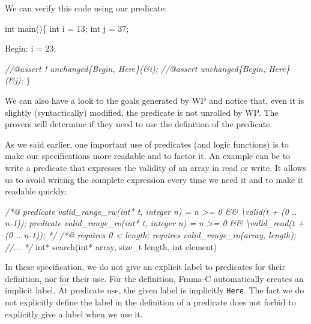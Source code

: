 \documentclass[12pt,francais,]{scrbook}
\newenvironment{Shaded}{}{}
\newcommand{\DataTypeTok}[1]{\textcolor[rgb]{0.56,0.13,0.00}{{#1}}}
\newcommand{\DecValTok}[1]{\textcolor[rgb]{0.25,0.63,0.44}{{#1}}}
\newcommand{\CommentTok}[1]{\textcolor[rgb]{0.38,0.63,0.69}{\textit{{#1}}}}
\newcommand{\NormalTok}[1]{{#1}}
\begin{document}
We can verify this code using our predicate:

\begin{footnotesize}\begin{Shaded}
\begin{Highlighting}[]
\DataTypeTok{int} \NormalTok{main()\{}
  \DataTypeTok{int} \NormalTok{i = }\DecValTok{13}\NormalTok{;}
  \DataTypeTok{int} \NormalTok{j = }\DecValTok{37}\NormalTok{;}

 \NormalTok{Begin:}
  \NormalTok{i = }\DecValTok{23}\NormalTok{;}
 
  \CommentTok{//@assert ! unchanged\{Begin, Here\}(&i);}
  \CommentTok{//@assert   unchanged\{Begin, Here\}(&j);}
\NormalTok{\}}
\end{Highlighting}
\end{Shaded}\end{footnotesize}

We can also have a look to the goals generated by WP and notice that,
even it is slightly (syntactically) modified, the predicate is not
unrolled by WP. The provers will determine if they need to use the
definition of the predicate.

As we said earlier, one important use of predicates (and logic
functions) is to make our specifications more readable and to factor it.
An example can be to write a predicate that expresses the validity of an
array in read or write. It allows us to avoid writing the complete
expression every time we need it and to make it readable quickly:

\begin{footnotesize}\begin{Shaded}
\begin{Highlighting}[]
\CommentTok{/*@}
\CommentTok{  predicate valid_range_rw(int* t, integer n) =}
\CommentTok{    n >= 0 && \textbackslash{}valid(t + (0 .. n-1));}
\CommentTok{  predicate valid_range_ro(int* t, integer n) =}
\CommentTok{    n >= 0 && \textbackslash{}valid_read(t + (0 .. n-1));}
\CommentTok{*/}
\CommentTok{/*@}
\CommentTok{  requires 0 < length;}
\CommentTok{  requires valid_range_ro(array, length);}
\CommentTok{  //...}
\CommentTok{*/}
\DataTypeTok{int}\NormalTok{* search(}\DataTypeTok{int}\NormalTok{* array, size_t length, }\DataTypeTok{int} \NormalTok{element)}
\end{Highlighting}
\end{Shaded}\end{footnotesize}

In these specification, we do not give an explicit label to predicates
for their definition, nor for their use. For the definition, Frama-C
automatically creates an implicit label. At predicate use, the given
label is implicitly \texttt{Here}. The fact we do not explicitly define
the label in the definition of a predicate does not forbid to explicitly
give a label when we use it.
\end{document}
